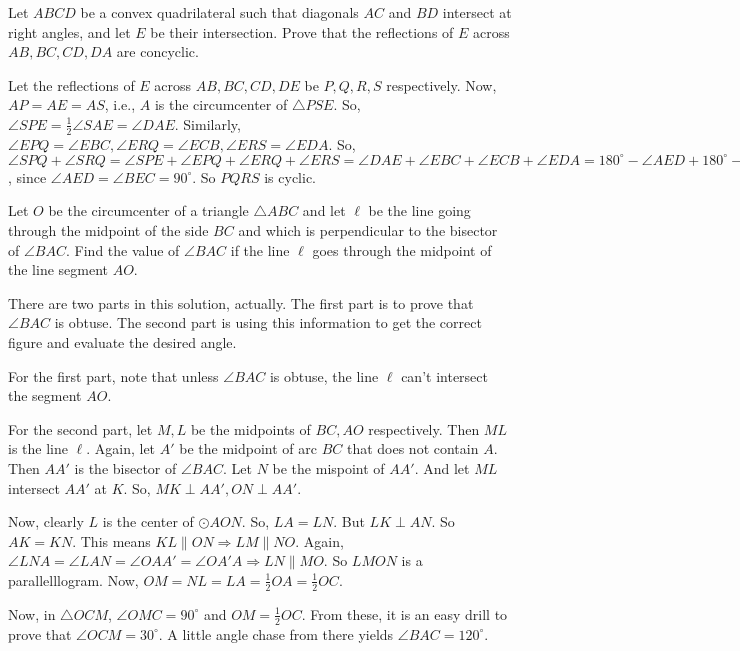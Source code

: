 \documentclass{subfile}
\begin{document}
	
	\begin{problem}
		Let $ABCD$ be a convex quadrilateral such that diagonals $AC$ and $BD$ intersect at right angles, and let $E$ be their intersection. Prove that the reflections of $E$ across $AB,BC,CD,DA$ are concyclic. 
	\end{problem}
	
	
	\begin{solution}
		Let the reflections of $E$ across $AB,BC,CD,DE$ be $P,Q,R,S$ respectively. Now, $AP=AE=AS$, i.e., $A$ is the circumcenter of $\triangle PSE$. So, $\angle SPE=\frac{1}{2}\angle SAE=\angle DAE$. Similarly, $\angle EPQ=\angle EBC, \angle ERQ=\angle ECB, \angle ERS=\angle EDA$. So, $\angle SPQ+\angle SRQ=\angle SPE+\angle EPQ+\angle ERQ+\angle ERS=\angle DAE+\angle EBC+\angle ECB+\angle EDA=180^{\circ}-\angle AED+180^{\circ}-\angle BEC=180^{\circ}$, since $\angle AED=\angle BEC=90^{\circ}$. So $PQRS$ is cyclic.
	\end{solution}
	
	\newpage
	\begin{problem}
		Let $O$ be the circumcenter of a triangle $\triangle ABC$ and let $\ell$ be the line going through the midpoint of the side $BC$ and which is perpendicular to the bisector of $\angle BAC$. Find the value of $\angle BAC$ if the line $\ell$ goes through the midpoint of the line segment $AO$.
	\end{problem}
	
	\begin{solution}
		There are two parts in this solution, actually. The first part is to prove that $\angle BAC$ is obtuse. The second part is using this information to get the correct figure and evaluate the desired angle. 
		
		For the first part, note that unless $\angle BAC$ is obtuse, the line $\ell$ can't intersect the segment $AO$. 
		
		For the second part, let $M,L$ be the midpoints of $BC,AO$ respectively. Then $ML$ is the line $\ell$. Again, let $A'$ be the midpoint of arc $BC$ that does not contain $A$. Then $AA'$ is the bisector of $\angle BAC$. Let $N$ be the mispoint of $AA'$. And let $ML$ intersect $AA'$ at $K$. So, $MK\perp AA',ON\perp AA'$.
		
		Now, clearly $L$ is the center of $\odot AON$. So, $LA=LN$. But $LK\perp AN$. So $AK=KN$. This means $KL\parallel ON\Rightarrow LM\parallel NO$. Again, $\angle LNA=\angle LAN=\angle OAA'=\angle OA'A\Rightarrow LN\parallel MO$. So $LMON$ is a parallelllogram. Now, $OM=NL=LA=\frac{1}{2}OA=\frac{1}{2}OC$.
		
		Now, in $\triangle OCM$, $\angle OMC=90^{\circ}$ and $OM=\frac{1}{2}OC$. From these, it is an easy drill to prove that $\angle OCM=30^{\circ}$. A little angle chase from there yields $\angle BAC=120^{\circ}$. 
	\end{solution}
	
\end{document}
